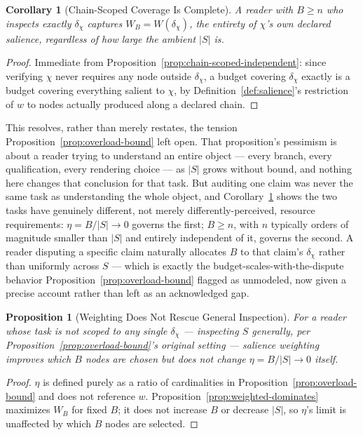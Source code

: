 \documentclass[11pt]{article}
\newtheorem{proposition}[theorem]{Proposition}
\newtheorem{corollary}[theorem]{Corollary}
\theoremstyle{definition}
\begin{document}
\begin{corollary}[Chain-Scoped Coverage Is Complete]
\label{cor:chain-scoped-complete}
A reader with $B \geq n$ who inspects exactly $\delta_\chi$ captures $W_B = W(\delta_\chi)$, the entirety of $\chi$'s own declared salience, regardless of how large the ambient $|S|$ is.
\end{corollary}
\begin{proof}
Immediate from Proposition~\ref{prop:chain-scoped-independent}: since verifying $\chi$ never requires any node outside $\delta_\chi$, a budget covering $\delta_\chi$ exactly is a budget covering everything salient to $\chi$, by Definition~\ref{def:salience}'s restriction of $w$ to nodes actually produced along a declared chain.
\end{proof}

This resolves, rather than merely restates, the tension Proposition~\ref{prop:overload-bound} left open. That proposition's pessimism is about a reader trying to understand an entire object --- every branch, every qualification, every rendering choice --- as $|S|$ grows without bound, and nothing here changes that conclusion for that task. But auditing one claim was never the same task as understanding the whole object, and Corollary~\ref{cor:chain-scoped-complete} shows the two tasks have genuinely different, not merely differently-perceived, resource requirements: $\eta = B/|S| \to 0$ governs the first; $B \geq n$, with $n$ typically orders of magnitude smaller than $|S|$ and entirely independent of it, governs the second. A reader disputing a specific claim naturally allocates $B$ to that claim's $\delta_\chi$ rather than uniformly across $S$ --- which is exactly the budget-scales-with-the-dispute behavior Proposition~\ref{prop:overload-bound} flagged as unmodeled, now given a precise account rather than left as an acknowledged gap.

\begin{proposition}[Weighting Does Not Rescue General Inspection]
\label{prop:weighting-no-rescue}
For a reader whose task is not scoped to any single $\delta_\chi$ --- inspecting $S$ generally, per Proposition~\ref{prop:overload-bound}'s original setting --- salience weighting improves \emph{which} $B$ nodes are chosen but does not change $\eta = B/|S| \to 0$ itself.
\end{proposition}
\begin{proof}
$\eta$ is defined purely as a ratio of cardinalities in Proposition~\ref{prop:overload-bound} and does not reference $w$. Proposition~\ref{prop:weighted-dominates} maximizes $W_B$ for fixed $B$; it does not increase $B$ or decrease $|S|$, so $\eta$'s limit is unaffected by which $B$ nodes are selected.
\end{proof}
\end{document}
